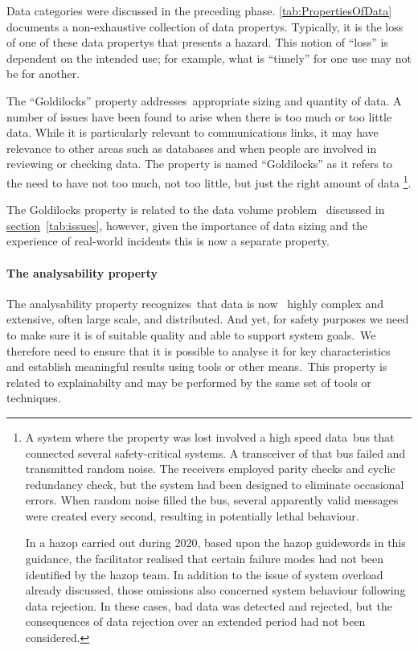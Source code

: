Data categories were discussed in the preceding phase. \cbstart\autoref{tab:PropertiesOfData} documents a non-exhaustive collection of \glspl{data property}. Typically, it is the loss of one of these \glspl{data property} that presents a \gls{hazard}. This notion of ``loss'' is dependent on the intended use; for example, what is ``timely'' for one use may not be for another.\cbend\

The ``Goldilocks'' property \cbstart addresses\cbend\ appropriate sizing and quantity of data. A number of issues have been found to arise when there is too much or too little data. While it is particularly relevant to communications links, it may have relevance to other areas such as \glspl{database} and when people are involved in reviewing or checking data. The property is named ``Goldilocks'' as it refers to the need to have not too much, not too little, but just the right amount of data%
%
\footnote{A system where the property was lost involved a high speed \cbstart data\cbend\ bus that connected several safety-critical systems. A transceiver of that bus failed and transmitted random noise. The receivers employed parity checks and cyclic redundancy check, but the system had been designed to eliminate occasional \cbstart\glspl{error}\cbend. When random noise filled the bus, several apparently valid messages were created every second, resulting in potentially lethal behaviour.

In a \gls{hazop} carried out during 2020, based upon the \gls{hazop} guidewords \cbstart in this guidance\cbend, the facilitator realised that certain failure modes had not been identified by the \gls{hazop} team. In addition to the issue of system overload already discussed, those omissions also concerned system behaviour following data rejection. In these cases, bad data was detected and rejected, but the consequences of data rejection over an extended period had not been considered.}.

The Goldilocks property is related to the \cbstart data volume problem \cbend\ discussed in \hyperref[tab:issues]{section}~\ref{tab:issues}, however, given the importance of data sizing and the experience of real-world incidents this is now a separate property.

%
\paragraph{The analysability property}\label{bkm:guidance:analysability}
The analysability property \cbstart recognizes\cbend\ that data is now \cbstart\ highly complex and extensive, often large scale, and distributed. And yet, for safety purposes we need to make sure it is of suitable quality and able to support system goals.\cbend\
We therefore need to ensure that it is possible to analyse it for key characteristics and \cbstart establish meaningful results using tools or other means.\cbend\ This property is related to explainabilty and may be performed by the same set of tools or techniques.

